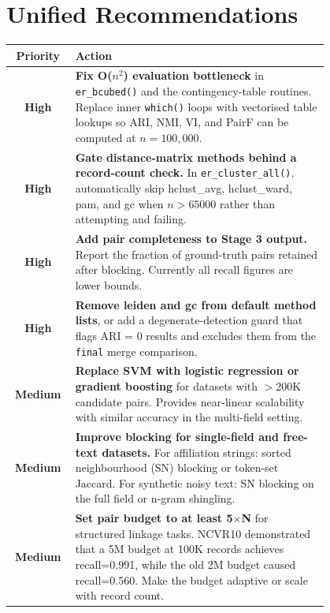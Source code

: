 \documentclass[11pt, a4paper]{article}
\begin{document}
\section{Unified Recommendations}

\begin{table}[h!]
\centering
\small
\begin{tabular}{cp{0.80\linewidth}}
\toprule
\textbf{Priority} & \textbf{Action} \\
\midrule
{\color{highprio}\textbf{High}} &
  \textbf{Fix O($n^2$) evaluation bottleneck} in \texttt{er\_bcubed()} and the
  contingency-table routines. Replace inner \texttt{which()} loops with vectorised
  table lookups so ARI, NMI, VI, and PairF can be computed at $n = 100{,}000$. \\[4pt]
{\color{highprio}\textbf{High}} &
  \textbf{Gate distance-matrix methods behind a record-count check.}
  In \texttt{er\_cluster\_all()}, automatically skip hclust\_avg, hclust\_ward, pam, and gc
  when $n > 65000$ rather than attempting and failing. \\[4pt]
{\color{highprio}\textbf{High}} &
  \textbf{Add pair completeness to Stage 3 output.}
  Report the fraction of ground-truth pairs retained after blocking. Currently all
  recall figures are lower bounds. \\[4pt]
{\color{highprio}\textbf{High}} &
  \textbf{Remove leiden and gc from default method lists},
  or add a degenerate-detection guard that flags ARI = 0 results and excludes
  them from the \texttt{final} merge comparison. \\[4pt]
{\color{medprio}\textbf{Medium}} &
  \textbf{Replace SVM with logistic regression or gradient boosting}
  for datasets with $>$200K candidate pairs. Provides near-linear scalability
  with similar accuracy in the multi-field setting. \\[4pt]
{\color{medprio}\textbf{Medium}} &
  \textbf{Improve blocking for single-field and free-text datasets.}
  For affiliation strings: sorted neighbourhood (SN) blocking or token-set
  Jaccard. For synthetic noisy text: SN blocking on the full field or n-gram
  shingling. \\[4pt]
{\color{medprio}\textbf{Medium}} &
  \textbf{Set pair budget to at least 5$\times$N} for structured linkage tasks.
  NCVR10 demonstrated that a 5M budget at 100K records achieves recall=0.991,
  while the old 2M budget caused recall=0.560. Make the budget adaptive or
  scale with record count. \\[4pt]

\end{tabular}
\end{table}
\end{document}
